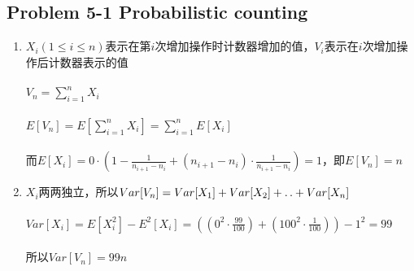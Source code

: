 \subsection*{Problem 5-1 Probabilistic counting}
\begin{enumerate}
	\item	$X_i(1 \leq i \leq n)$表示在第$i$次增加操作时计数器增加的值，$V_i$表示在$i$次增加操作后计数器表示的值 \\ \\
		$V_n=\sum_{i=1}^{n}{X_i}$ \\ \\
		$E[V_n]=E[\sum_{i=1}^{n}{X_i}]=\sum_{i=1}^{n}{E[X_i]}$ \\ \\
		而$E[X_i]=0 \cdot (1 - \frac{1}{n_{i + 1} - n_i} + (n_{i + 1}-n_i) \cdot \frac{1}{n_{i + 1} - n_i}) = 1$，即$E[V_n]=n$
	\item	$X_i$两两独立，所以$Var[V_n]=Var[X_1] + Var[X_2] + \mathinner{\ldotp\ldotp} + Var[X_n]$ \\ \\
		$Var[X_i] = E[X_i^2] - E^2{[X_i]}=((0^2 \cdot \frac{99}{100}) + (100^2 \cdot \frac{1}{100})) - 1^2 = 99$ \\ \\
		所以$Var[V_n]=99n$
\end{enumerate}

